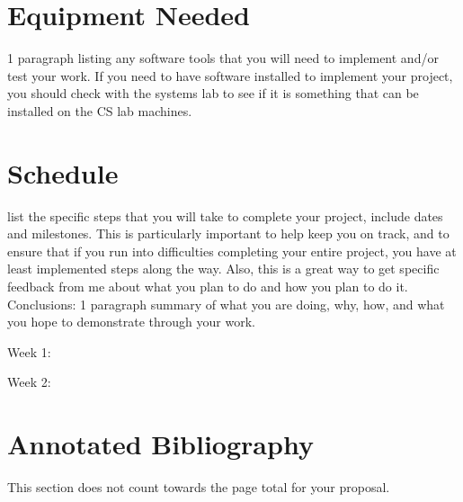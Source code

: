 \documentclass[11pt]{article}
\newenvironment{my_enumerate}{
  \begin{enumerate}
    \setlength{\itemsep}{1pt}
      \setlength{\parskip}{0pt}
\setlength{\parsep}{0pt}}{\end{enumerate}
}
\begin{document}
\section {Equipment Needed}\label{equip}
1 paragraph listing any software tools that you will need to implement and/or
test your work. If you need to have software installed to implement your
project, you should check with the systems lab to see if it is something that
can be installed on the CS lab machines.

\section {Schedule}\label{sched}
list the specific steps that you will take to complete your project, include
dates and milestones. This is particularly important to help keep you on track,
and to ensure that if you run into difficulties completing your entire project,
you have at least implemented steps along the way. Also, this is a great way to
get specific feedback from me about what you plan to do and how you plan to do
it.  Conclusions: 1 paragraph summary of what you are doing, why, how, and what
you hope to demonstrate through your work.

\begin{my_enumerate}
  \item Week 1: 
  \item Week 2: 
\end{my_enumerate} 






\newpage 

\onecolumn
\section*{Annotated Bibliography}\label{annon} 

This section does not count towards the page total for your proposal.
\end{document}
